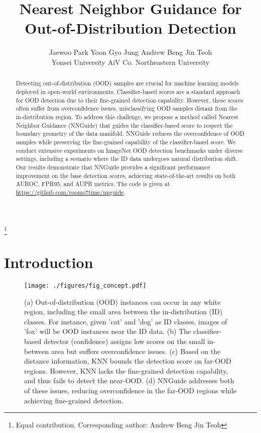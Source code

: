 \documentclass[10pt,twocolumn,letterpaper]{article}
\newcommand\blfootnote[1]{\begingroup
\renewcommand\thefootnote{}\footnote{#1}\addtocounter{footnote}{-1}\endgroup
}
\begin{document}
\title{Nearest Neighbor Guidance for Out-of-Distribution Detection}

\author{
Jaewoo Park \quad Yoon Gyo Jung \quad Andrew Beng Jin Teoh \\
Yonsei University \quad AiV Co. \quad Northeastern University
}


\maketitle
\ificcvfinal\thispagestyle{empty}\fi


\begin{abstract}
Detecting out-of-distribution (OOD) samples are crucial for machine learning models deployed in open-world environments. Classifier-based scores are a standard approach for OOD detection due to their fine-grained detection capability. However, these scores often suffer from overconfidence issues, misclassifying OOD samples distant from the in-distribution region. To address this challenge, we propose a method called Nearest Neighbor Guidance (NNGuide) that guides the classifier-based score to respect the boundary geometry of the data manifold. NNGuide reduces the overconfidence of OOD samples while preserving the fine-grained capability of the classifier-based score. We conduct extensive experiments on ImageNet OOD detection benchmarks under diverse settings, including a scenario where the ID data undergoes natural distribution shift. Our results demonstrate that NNGuide provides a significant performance improvement on the base detection scores, achieving state-of-the-art results on both AUROC, FPR95, and AUPR metrics. The code is given at \url{https://github.com/roomo7time/nnguide}.
\end{abstract}

\blfootnote{\noindent Equal contribution.  Corresponding author: Andrew Beng Jin Teoh}

\section{Introduction}
\label{sec:intro}


\begin{figure}[t]
\centering
\texttt{[image: ./figures/fig\_concept.pdf]}
\caption{
(a) Out-of-distribution (OOD) instances can occur in any white region, including the small area between the in-distribution (ID) classes. For instance, given 'cat' and 'dog' as ID classes, images of 'fox' will be OOD instances near the ID data. (b) The classifier-based detector (\ie confidence) assigns low scores on the small in-between area but suffers overconfidence issues. (c) Based on the distance information, KNN bounds the detection score on far-OOD regions. However, KNN lacks the fine-grained detection capability, and thus fails to detect the near-OOD. (d) NNGuide addresses both of these issues, reducing overconfidence in the far-OOD regions while achieving fine-grained detection.}
\label{fig:concept}
\end{figure}
\end{document}
